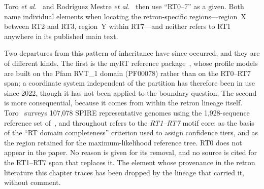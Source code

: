 


Toro \textit{et al.}~\cite{toro2019} and Rodr{\'i}guez Mestre \textit{et
al.}~\cite{mestre2020} then use ``RT0--7'' as a given. Both name individual
elements when locating the retron-specific regions---region~X between RT2 and
RT3, region~Y within RT7---and neither refers to RT1 anywhere in its published
main text.

Two departures from this pattern of inheritance have since occurred, and they
are of different kinds. The first is the myRT reference package~\cite{sharifi2022},
whose profile models are built on the Pfam RVT\_1 domain (PF00078) rather than
on the RT0--RT7 span; a coordinate system independent of the partition has
therefore been in use since 2022, though it has not been applied to the
boundary question. The second is more consequential, because it comes from
within the retron lineage itself. Toro~\cite{toro2026} surveys 107{,}078 SPIRE
representative genomes using the 1{,}928-sequence reference set
of~\cite{mestre2020}, and throughout refers to the \emph{RT1--RT7} motif core:
as the basis of the ``RT domain completeness'' criterion used to assign
confidence tiers, and as the region retained for the maximum-likelihood
reference tree. RT0 does not appear in the paper. No reason is given for its
removal, and no source is cited for the RT1--RT7 span that replaces it. The
element whose provenance in the retron literature this chapter traces has
been dropped by the lineage that carried it, without comment.

